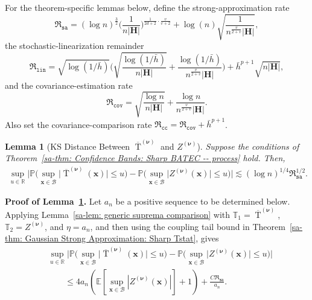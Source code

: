 \documentclass[10pt]{article}
\newtheorem{lem}{Lemma}
\DeclareMathOperator{\Tstat}{T}
\renewcommand{\P}{\mathbb{P}}
\newcommand{\E}{\mathbb{E}}
\newcommand{\reals}{\mathbb{R}}
\newcommand{\bH}{\mathbf{H}}
\newcommand{\bx}{\mathbf{x}}
\newcommand{\bnu}{\boldsymbol{\nu}}
\newcommand{\B}{\mathcal{B}}
\begin{document}
For the theorem-specific lemmas below, define the strong-approximation rate
\[
    \mathfrak{R}_{\mathtt{sa}}
    =
    (\log n)^{\frac{3}{2}}\Big(\frac{1}{n |\bH|}\Big)^{\frac{1}{2d+2}\cdot \frac{v}{v+2}}
    + \log(n)\sqrt{\frac{1}{n^{\frac{v}{2+v}}|\bH|}},
\]
the stochastic-linearization remainder
\[
    \mathfrak{R}_{\mathtt{lin}}
    =
    \sqrt{\log(1/\bar{h})}
    \Big(\sqrt{\frac{\log(1/\bar{h})}{n|\bH|}}
    + \frac{\log(1/\bar{h})}{n^{\frac{v}{2+v}}|\bH|} \Big)
    + \bar{h}^{p+1} \sqrt{n|\bH|},
\]
and the covariance-estimation rate
\[
    \mathfrak{R}_{\mathtt{cov}}
    =
    \sqrt{\frac{\log n}{n|\bH|}}
    + \frac{\log n}{n^{\frac{v}{2+v}}|\bH|}.
\]
Also set the covariance-comparison rate $\mathfrak{R}_{\mathtt{cc}}=\mathfrak{R}_{\mathtt{cov}}+\bar h^{p+1}$.

\begin{lem}[KS Distance Between $\overline{\Tstat}^{(\bnu)}$ and $Z^{(\bnu)}$]\label{sa-lem: infeasible gaussian to bahadur representation}
Suppose the conditions of Theorem~\ref{sa-thm: Confidence Bands: Sharp BATEC -- process} hold. Then,
\begin{align*}
    \sup_{u \in \reals} \Big|\P \Big(\sup_{\bx \in \B} \big|\overline{\Tstat}^{(\bnu)}(\bx)\big| \leq u\Big)
     - \P \Big(\sup_{\bx \in \B} \big|Z^{(\bnu)}(\bx)\big| \leq u\Big)\Big|
    \lesssim (\log n)^{1/4}\mathfrak{R}_{\mathtt{sa}}^{1/2}.
\end{align*}
\end{lem}


\noindent\textbf{Proof of Lemma~\ref{sa-lem: infeasible gaussian to bahadur representation}.} Let $a_n$ be a positive sequence to be determined below. Applying Lemma~\ref{sa-lem: generic suprema comparison} with $\mathbb{T}_1=\overline{\Tstat}^{(\bnu)}$, $\mathbb{T}_2=Z^{(\bnu)}$, and $\eta=a_n$, and then using the coupling tail bound in Theorem~\ref{sa-thm: Gaussian Strong Approximation: Sharp Tstat}, gives
\begin{align*}
    &\sup_{u\in\reals}\Big|
    \P \Big(\sup_{\bx \in \B} \big|\overline{\Tstat}^{(\bnu)}(\bx)\big| \leq u\Big)
    -\P \Big(\sup_{\bx \in \B} \big|Z^{(\bnu)}(\bx)\big| \leq u\Big)
    \Big|\\
    &\qquad\le
    4a_n\left(\E\left[\sup_{\bx\in\B}|Z^{(\bnu)}(\bx)|\right]+1\right)
    + \frac{C\mathfrak{R}_{\mathtt{sa}}}{a_n}.
\end{align*}
\end{document}
